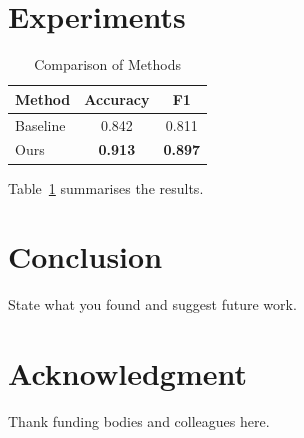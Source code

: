 \documentclass[conference]{IEEEtran}
\begin{document}
\section{Experiments}
\begin{table}[htbp]
\caption{Comparison of Methods}
\label{tab:results}
\centering
\begin{tabular}{lcc}
\toprule
\textbf{Method} & \textbf{Accuracy} & \textbf{F1} \\
\midrule
Baseline & 0.842 & 0.811 \\
Ours & \textbf{0.913} & \textbf{0.897} \\
\bottomrule
\end{tabular}
\end{table}

Table~\ref{tab:results} summarises the results.

\section{Conclusion}
State what you found and suggest future work.

\section*{Acknowledgment}
Thank funding bodies and colleagues here.



\end{document}
